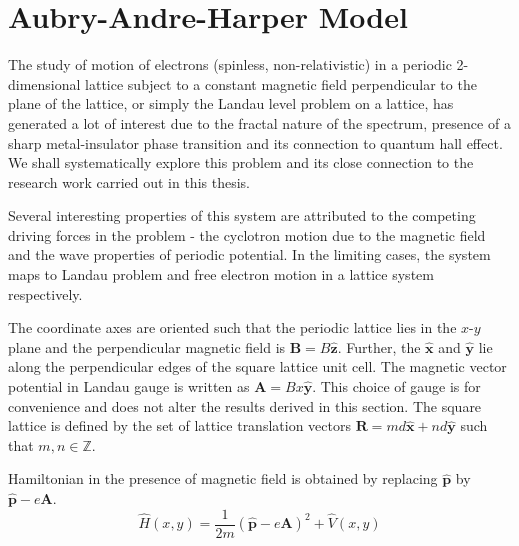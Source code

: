 %

\chapter{Aubry-Andre-Harper Model}\label{ch:aah}
The study of motion of electrons (spinless, non-relativistic) in a periodic 2-dimensional lattice subject to a constant magnetic field perpendicular to the plane of the lattice, or simply the Landau level problem on a lattice, 
has generated a lot of interest due to the fractal nature of the spectrum, presence of a sharp metal-insulator phase transition and its connection to quantum hall effect. We shall 
systematically explore this problem and its close connection to the research work carried out in this thesis.

Several interesting properties of this system are attributed to the competing driving forces in the problem - the cyclotron motion due to the magnetic field and the wave properties of periodic
potential. In the limiting cases, the system maps to Landau problem and free electron motion in a lattice system respectively.

The coordinate axes are oriented such that the periodic lattice lies in the $x$-$y$ plane and the perpendicular magnetic field is $\mathbf{B} = B\hat{\mathbf{z}}$. Further,
the $\hat{\mathbf{x}}$ and $\hat{\mathbf{y}}$ lie along the perpendicular edges of the square lattice unit cell. The magnetic vector potential in Landau gauge is written as $\mathbf{A} = Bx\hat{\mathbf{y}}$. This choice of gauge is for convenience and does not alter the 
results derived in this section. The square lattice is defined by the set of lattice translation vectors $\mathbf{R} = md \hat{\mathbf{x}} + nd\hat{\mathbf{y}}$ such that $m, n \in \mathbb{Z}$.

Hamiltonian in the presence of magnetic field is obtained by replacing $\hat{\mathbf{p}}$ by $\hat{\mathbf{p}} - e\mathbf{A}$.
\begin{equation}
 \hat{H}(x, y) = \frac{1}{2m}(\hat{\mathbf{p}} - e\mathbf{A})^2 + \hat{V}(x,y)
\end{equation}

